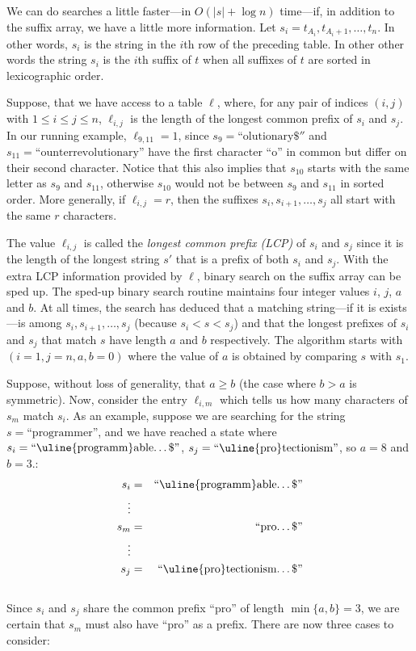 We can do searches a little faster---in $O(|s|+\log n)$ time---if,
in addition to the suffix array, we have a little more information.
Let $s_i=t_{A_i}, t_{A_i+1},\ldots,t_{n}$. In other words, $s_i$ is the
string in the $i$th row of the preceding table. In other other words
the string $s_i$ is the $i$th suffix of $t$ when all suffixes of $t$
are sorted in lexicographic order.

Suppose, that we have access to a table $\ell$, where, for any
pair of indices $(i,j)$ with $1\le i\le j\le n$, $\ell_{i,j}$ is
the length of the longest common prefix of $s_i$ and $s_j$. In our
running example, $\ell_{9,11}=1$, since $s_9=\text{``olutionary\$}''$
and $s_{11}=\text{``ounterrevolutionary''}$ have the first character
``o'' in common but differ on their second character. Notice that
this also implies that $s_{10}$ starts with the same letter as $s_9$
and $s_{11}$, otherwise $s_{10}$ would not be between $s_9$ and $s_{11}$
in sorted order.  More generally, if $\ell_{i,j}=r$, then the suffixes
$s_i,s_{i+1},\ldots,s_{j}$ all start with the same $r$ characters.

The value $\ell_{i,j}$ is called the \emph{longest common prefix (LCP)}
of $s_i$ and $s_j$ since it is the length of the longest string $s'$
that is a prefix of both $s_i$ and $s_j$.  With the extra LCP information
provided by $\ell$, binary search on the suffix array can be sped up.
The sped-up binary search routine maintains four integer values $i$,
$j$, $a$ and $b$.  At all times, the search has deduced that a matching
string---if it is exists---is among $s_i,s_{i+1},\ldots,s_j$ (because
$s_i < s < s_j$) and that the longest prefixes of $s_i$ and $s_j$ that
match $s$ have length $a$ and $b$ respectively. The algorithm starts with
$(i=1,j=n,a,b=0)$ where the value of $a$ is obtained by comparing $s$
with $s_1$.

Suppose, without loss of generality, that $a \ge b$ (the case where $b>a$ is symmetric).  Now, consider the entry $\ell_{i,m}$ which tells us how many characters of $s_m$ match $s_i$.
As an example, suppose we are searching for the string $s=\text{``programmer''}$, and we have reached a state where $s_i=\text{``\uline{programm}able\ldots\$''}$, $s_j=\text{``\uline{pro}tectionism''}$, so $a=8$ and $b=3$.: \\[\parskip]
  \begin{eqnarray*}
     s_i & = & \text{``\uline{programm}able\ldots\$''} \\
     \vdots & \\
     s_m & = & \text{``pro\ldots\$''} \\
     \vdots & \\
     s_j & = & \text{``\uline{pro}tectionism\ldots\$''} \\
  \end{eqnarray*} \\[\parskip]
Since $s_i$ and $s_j$ share the common prefix ``pro'' of length $\min\{a,b\}=3$, we are certain that $s_m$ must also have ``pro'' as a prefix.
There are now three cases to consider:

